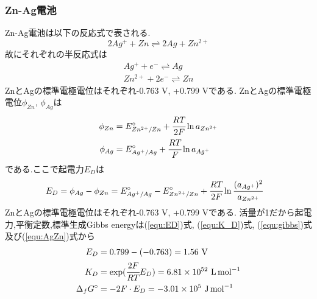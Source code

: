 \subsubsection{Zn-Ag電池}
Zn-Ag電池は以下の反応式で表される.
\begin{equation}
  2Ag^+ + Zn \rightleftharpoons 2Ag + Zn^{2+}
\end{equation}
故にそれぞれの半反応式は
\begin{align}
  Ag^+ + e^- \rightleftharpoons Ag\\
  Zn^{2+} + 2e^{-} \rightleftharpoons Zn
\end{align}
ZnとAgの標準電極電位はそれぞれ-0.763 \si{\volt}, +0.799 \si{\volt}である.
ZnとAgの標準電極電位$\phi_{Zn}$, $\phi_{Ag}$は
\begin{align}
  \phi_{Zn}&=E^{\circ}_{Zn^{2+}/Zn}+\cfrac{RT}{2F}\ln a_{Zn^{2+}}\\
  \phi_{Ag}&=E^{\circ}_{Ag^{+}/Ag}+\cfrac{RT}{F}\ln a_{Ag^{+}}
\end{align}
である.ここで起電力$E_D$は
\begin{align}
  \label{equ:AgZn}
  E_D&=\phi_{Ag}-\phi_{Zn}=E^{\circ}_{Ag^{+}/Ag}-E^{\circ}_{Zn^{2+}/Zn}+\cfrac{RT}{2F} \ln \cfrac{(a_{Ag^+})^2}{a_{Zn^{2+}}}
\end{align}
ZnとAgの標準電極電位はそれぞれ-0.763 \si{\volt}, +0.799 \si{\volt}である.
活量が1だから起電力,平衡定数,標準生成Gibbs energyは(\ref{equ:ED})式, (\ref{equ:K_D})式, (\ref{equ:gibbs})式及び(\ref{equ:AgZn})式から
\begin{align*}
  E_D&=0.799-(-0.763)=1.56\ \si{\volt}\\
  K_D&=\exp(\cfrac{2F}{RT}E_D)=6.81\times10^{52}\ \si{L.\mole^{-1}}\\
  \Delta_fG^{\circ}&=-2F\cdot E_D=-3.01\times10^5\ \si{\joule.\mole^{-1}}
\end{align*}


